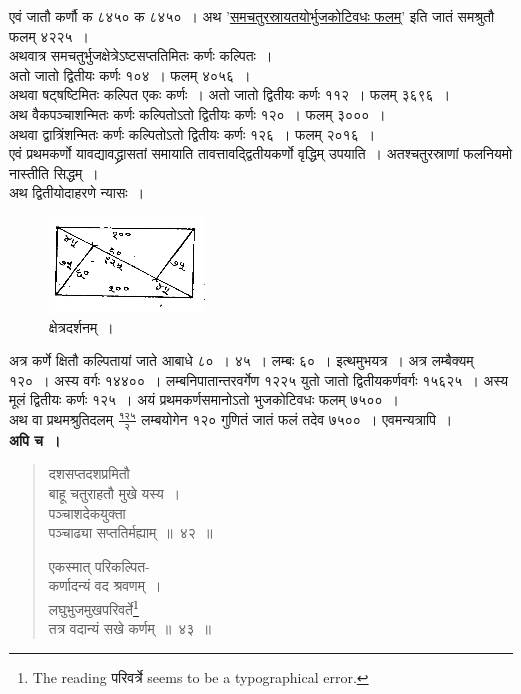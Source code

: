 \documentclass[11pt, openany]{book}
\begin{document}
 एवं जातौ कर्णौ क ८४५० क ८४५०~। अथ '\hyperref[4.45]{समचतुरस्रायतयोर्भुजकोटिवधः फलम्}' इति जातं समश्रुतौ फलम् ४२२५~। \\
\indent अथवात्र समचतुर्भुजक्षेत्रेऽष्टसप्ततिमितः कर्णः कल्पितः~। \\
\indent अतो जातो द्वितीयः कर्णः १०४~। फलम् ४०५६~। \\
\indent अथवा षट्षष्टिमितः कल्पित एकः कर्णः~। अतो जातो द्वितीयः 
कर्णः ११२~। फलम् ३६९६~। \\
\indent अथ वैकपञ्चाशन्मितः कर्णः कल्पितोऽतो द्वितीयः कर्णः १२०~। 
फलम् ३०००~। \\
\indent अथवा द्वात्रिंशन्मितः कर्णः कल्पितोऽतो द्वितीयः कर्णः १२६~। 
फलम् २०१६~। \\
\indent एवं प्रथमकर्णो यावद्यावद्ध्रासतां समायाति तावत्तावद्द्वितीयकर्णो वृद्धिम् उपयाति~। अतश्चतुरस्राणां फलनियमो नास्तीति सिद्धम्~। \\
\indent अथ द्वितीयोदाहरणे न्यासः~। 

\begin{figure}[h!]
    \centering
   \captionsetup{labelformat=empty}
    \caption{क्षेत्रदर्शनम्~।}
\vspace{-2mm}
    \includegraphics[scale=0.8]{graphics/capture52.png}
\end{figure}

\newpage

 अत्र कर्णे क्षितौ कल्पितायां जाते आबाधे ८०~। ४५~। लम्बः ६०~। 
इत्थमुभयत्र~। अत्र लम्बैक्यम् १२०~। अस्य वर्गः १४४००~। लम्बनिपातान्तरवर्गेण १२२५ युतो जातो द्वितीयकर्णवर्गः १५६२५~। अस्य
मूलं द्वितीयः कर्णः १२५~। अयं प्रथमकर्णसमानोऽतो भुजकोटिवधः फलम् ७५००~। \\

\vspace{-3mm}
 अथ वा प्रथमश्रुतिदलम् $\frac{\mbox{१२५}}{\mbox{२}}$
लम्बयोगेन १२० गुणितं जातं
फलं तदेव ७५००~। एवमन्यत्रापि~। \\

\vspace{-2mm}
 \textbf{अपि च~।} 
\begin{quote}
    \bqt 
     दशसप्तदशप्रमितौ \\
     बाहू चतुराहतौ मुखे यस्य~।\\
पञ्चाशदेकयुक्ता \\
पञ्चाढ्या सप्ततिर्मह्याम्~॥~४२~॥
\vspace{1mm}

एकस्मात् परिकल्पित-\\
कर्णादन्यं वद श्रवणम्~।\\
लघुभुजमुखपरिवर्ते\footnote{The reading परिवर्त्रे seems to be a typographical error.} \\
तत्र वदान्यं सखे कर्णम्~॥~४३~॥
\end{quote}
\end{document}

